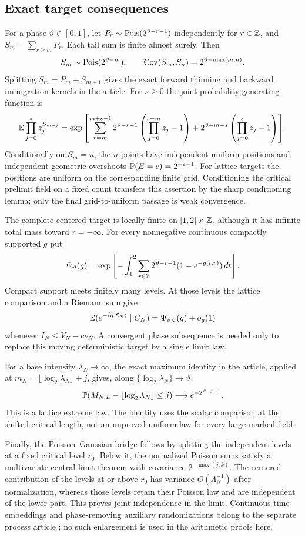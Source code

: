 \subsection{Exact target consequences}\label{supp:sec:target-consequences}
For a phase $\vartheta\in[0,1]$, let
$P_r\sim\operatorname{Pois}(2^{\vartheta-r-1})$ independently for $r\in\mathbb Z$, and
$S_m=\sum_{r\ge m}P_r$. Each tail sum is finite almost surely. Then
\[
 S_m\sim\operatorname{Pois}(2^{\vartheta-m}),\qquad
 \operatorname{Cov}(S_m,S_n)=2^{\vartheta-\max(m,n)}.
\]
Splitting $S_m=P_m+S_{m+1}$ gives the exact forward thinning and
backward immigration kernels in the article. For $s\ge0$ the joint
probability generating function is
\[
 \mathbb E\prod_{j=0}^s z_j^{S_{m+j}}
 =\exp\left[
 \sum_{r=m}^{m+s-1}2^{\vartheta-r-1}
       \left(\prod_{j=0}^{r-m}z_j-1\right)
 +2^{\vartheta-m-s}\left(\prod_{j=0}^sz_j-1\right)\right].
\]
Conditionally on $S_m=n$, the $n$ points have independent uniform
positions and independent geometric overshoots
$\mathbb P(E=e)=2^{-e-1}$. For lattice targets the positions are uniform on
the corresponding finite grid. Conditioning the critical prelimit field
on a fixed count transfers this assertion by the sharp conditioning
lemma; only the final grid-to-uniform passage is weak convergence.

The complete centered target is locally finite on $[1,2]\times\mathbb Z$,
although it has infinite total mass toward $r=-\infty$. For every
nonnegative continuous compactly supported $g$ put
\[
 \Psi_\vartheta(g)=
 \exp\left[-\int_1^2\sum_{r\in\mathbb Z}2^{\vartheta-r-1}
                                (1-e^{-g(t,r)})\,dt\right].
\]
Compact support meets finitely many levels. At those levels the lattice
comparison and a Riemann sum give
\[
 \mathbb E(e^{-\langle g,\mathcal E_N\rangle}\mid C_N)
                         =\Psi_{\vartheta_N}(g)+o_g(1)
\]
whenever $I_N\le V_N-c\nu_N$. A convergent phase subsequence is needed
only to replace this moving deterministic target by a single limit law.

For a base intensity $\lambda_N\to\infty$, the exact maximum identity
in the article, applied at
$m_N=\lfloor\log_2\lambda_N\rfloor+j$, gives, along
$\{\log_2\lambda_N\}\to\vartheta$,
\[
 \mathbb P(M_{N,L}-\lfloor\log_2\lambda_N\rfloor\le j)
                         \longrightarrow e^{-2^{\vartheta-j-1}}.
\]
This is a lattice extreme law. The identity uses the scalar comparison
at the shifted critical length, not an unproved uniform law for every
large marked field.

Finally, the Poisson--Gaussian bridge follows by splitting the independent
levels at a fixed critical level $r_0$. Below it, the normalized Poisson
sums satisfy a multivariate central limit theorem with covariance
$2^{-\max(j,k)}$. The centered contribution of the levels at or above
$r_0$ has variance $O(\Lambda_N^{-1})$ after normalization, whereas
those levels retain their Poisson law and are independent of the lower
part. This proves joint independence in the limit. Continuous-time
embeddings and phase-removing auxiliary randomizations belong to the
separate process article \cite{PoulyLatticePoissonFlows2026}; no such enlargement
is used in the arithmetic proofs here.
